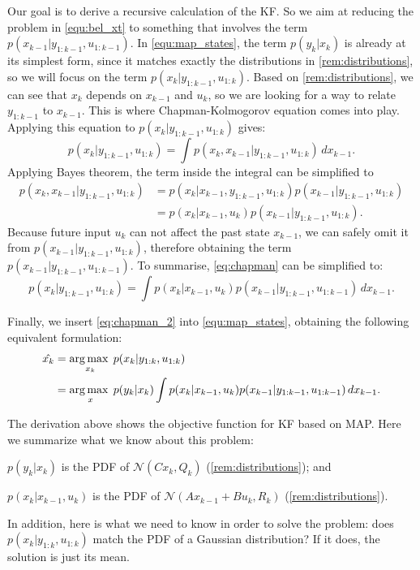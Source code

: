 Our goal is to derive a recursive calculation of the KF.
So we aim at reducing the problem in \cref{equ:bel_xt} to something that involves the term $p(x_{k-1}|y_{1:k-1},u_{1:k-1})$.
In \cref{equ:map_states}, the term $p(y_k|x_k)$ is already at its simplest form, since it matches exactly the distributions in \cref{rem:distributions}, so we will focus on the term $p(x_k|y_{1:k-1},u_{1:k})$.
Based on \cref{rem:distributions}, we can see that $x_k$ depends on $x_{k-1}$ and $u_k$, so we are looking for a way to relate $y_{1:k-1}$ to $x_{k-1}$.
This is where Chapman-Kolmogorov equation \cite{ross2014a} comes into play.
Applying this equation to $p(x_k|y_{1:k-1},u_{1:k})$ gives:
\begin{equation}\label{eq:chapman}
		p(x_k|y_{1:k-1},u_{1:k}) = \int p(x_k, x_{k-1}|y_{1:k-1},u_{1:k})\,dx_{k-1}.
\end{equation}
Applying Bayes theorem, the term inside the integral can be simplified to 
\begin{equation}
	\begin{split}
		p(x_k, x_{k-1}|y_{1:k-1},u_{1:k}) &= p(x_k|x_{k-1},y_{1:k-1},u_{1:k})p(x_{k-1}|y_{1:k-1},u_{1:k})\\ & =
    p(x_k|x_{k-1},u_{k})p(x_{k-1}|y_{1:k-1},u_{1:k}).
	\end{split}
\end{equation}
Because future input $u_k$ can not affect the past state $x_{k-1}$, we can safely omit it from $p(x_{k-1}|y_{1:k-1},u_{1:k})$, therefore obtaining the term $p(x_{k-1}|y_{1:k-1},u_{1:k-1})$.
To summarise, \cref{eq:chapman} can be simplified to:
\begin{equation} \label{eq:chapman_2}
	p(x_k|y_{1:k-1},u_{1:k}) = \int p(x_k|x_{k-1},u_{k})p(x_{k-1}|y_{1:k-1},u_{1:k-1}) \,dx_{k-1}.
\end{equation}

Finally, we insert \cref{eq:chapman_2} into \cref{equ:map_states}, obtaining the following equivalent formulation:
\begin{equation} \label{equ:obj_expand}
	\begin{split}
		\hat{x_k} &= \operatorname*{arg\,max\;}_{x_k} p(x_k|y_{1:k},u_{1:k}) \\ &= \operatorname*{arg\,max\;}_{x} p(y_k|x_k)\int p(x_k|x_{k-1},u_{k})p(x_{k-1}|y_{1:k-1},u_{1:k-1}) \,dx_{k-1}.
	\end{split}
\end{equation} 

The derivation above shows the objective function for KF based on MAP.
Here we summarize what we know about this problem:
\begin{inparaitem}
\item $p(y_k|x_k)$ is the PDF of $\mathcal{N}(Cx_k,Q_k)$ (\cref{rem:distributions}); and
\item $p(x_k|x_{k-1},u_{k})$ is the PDF of $\mathcal{N}(Ax_{k-1}+Bu_k,R_k)$ (\cref{rem:distributions}).
\end{inparaitem}
In addition, here is what we need to know in order to solve the problem: does $p(x_k|y_{1:k},u_{1:k})$ match the PDF of a Gaussian distribution? If it does, the solution is just its mean.

